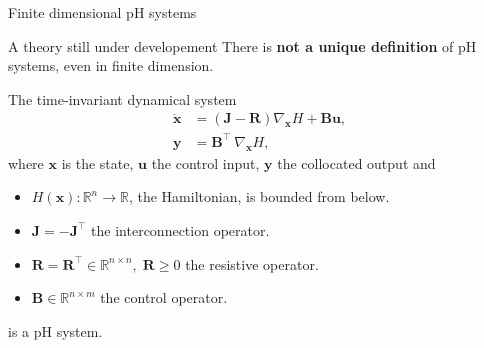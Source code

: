 \documentclass[aspectratio=169]{beamer}
\newcommand{\bbR}{\mathbb{R}}
\begin{document}
\begin{frame}{Finite dimensional pH systems}

\begin{alertblock}{A theory still under developement}
	There is \textbf{not a unique definition} of pH systems, even in finite dimension.
\end{alertblock}

\begin{definition}
	
	The time-invariant dynamical system
	\begin{equation*}
		\begin{aligned}
			\dot{\mathbf{x}} &= \left( \mathbf{J} - \mathbf{R} \right) \nabla_{\mathbf{x}} H + \mathbf{B}\mathbf{u}, \\
			\mathbf{y} &= \mathbf{B}^\top ~ \nabla_{\mathbf{x}} H,
		\end{aligned}
	\end{equation*}
	where $\mathbf{x}$ is the state, $\mathbf{u}$ the control input, $\mathbf{y}$ the collocated output and
	\begin{itemize}
		\item $H(\mathbf{x}) : \mathbb{R}^n \rightarrow \mathbb{R}$, the Hamiltonian, is bounded from below.
		\item $\mathbf{J}=-\mathbf{J}^\top $ the interconnection operator.
		\item $\mathbf{R}=\mathbf{R}^\top \in \bbR^{n \times n}, \; \mathbf{R} \ge 0$ the resistive operator.
		\item $\mathbf{B} \in \bbR^{n \times m}$ the control operator.
	\end{itemize}
	is a pH system.
\end{definition}

\end{frame}
\end{document}
